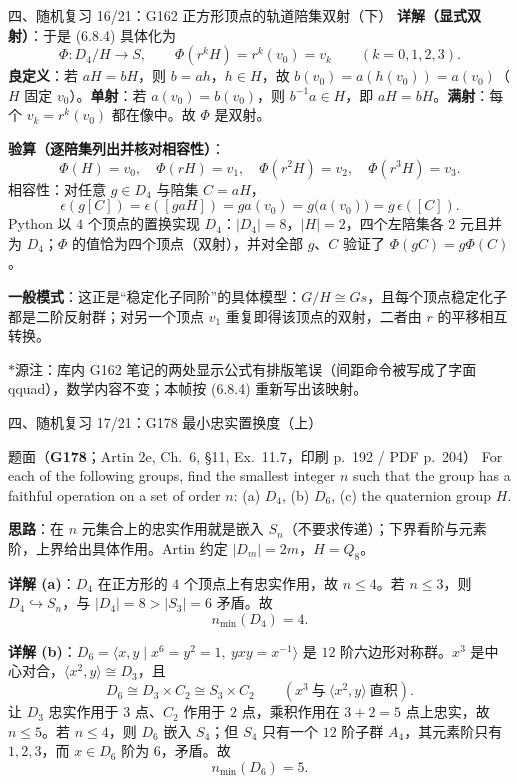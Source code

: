 \documentclass[aspectratio=169,10pt,fontset=none]{ctexbeamer}
\newcommand{\ex}[1]{\textcolor{accent}{\footnotesize\bfseries #1}}
\newcommand{\key}[1]{\textcolor{ink}{\bfseries #1}}
\newcommand{\starpt}{\textcolor{accent}{\bfseries$\ast$}}
\begin{document}
\begin{frame}[t]{四、随机复习 16/21：G162 正方形顶点的轨道\textendash{}陪集双射（下）}
\scriptsize
\key{详解（显式双射）}：于是 (6.8.4) 具体化为
\[ \Phi:D_4/H\longrightarrow S,\qquad \Phi(r^kH)=r^k(v_0)=v_k\qquad(k=0,1,2,3). \]
\textbf{良定义}：若 $aH=bH$，则 $b=ah$，$h\in H$，故 $b(v_0)=a(h(v_0))=a(v_0)$（$H$ 固定 $v_0$）。\textbf{单射}：若 $a(v_0)=b(v_0)$，则 $b^{-1}a\in H$，即 $aH=bH$。\textbf{满射}：每个 $v_k=r^k(v_0)$ 都在像中。故 $\Phi$ 是双射。

\key{验算（逐陪集列出并核对相容性）}：
\[ \Phi(H)=v_0,\quad \Phi(rH)=v_1,\quad \Phi(r^2H)=v_2,\quad \Phi(r^3H)=v_3. \]
相容性：对任意 $g\in D_4$ 与陪集 $C=aH$，
\[ \epsilon(g[C])=\epsilon([gaH])=ga(v_0)=g\bigl(a(v_0)\bigr)=g\,\epsilon([C]). \]
Python 以 $4$ 个顶点的置换实现 $D_4$：$|D_4|=8$，$|H|=2$，四个左陪集各 $2$ 元且并为 $D_4$；$\Phi$ 的值恰为四个顶点（双射），并对全部 $g$、$C$ 验证了 $\Phi(gC)=g\Phi(C)$。

\key{一般模式}：这正是“稳定化子同阶”的具体模型：$G/H\cong G s$，且每个顶点稳定化子都是二阶反射群；对另一个顶点 $v_1$ 重复即得该顶点的双射，二者由 $r$ 的平移相互转换。

\starpt 源注：库内 G162 笔记的两处显示公式有排版笔误（间距命令被写成了字面 qquad），数学内容不变；本帧按 (6.8.4) 重新写出该映射。
\end{frame}

\begin{frame}[t]{四、随机复习 17/21：G178 最小忠实置换度（上）}
\label{ex:G178}
\scriptsize
\begin{block}{\footnotesize 题面（\ex{G178}；Artin 2e, Ch.~6, §11, Ex.~11.7，印刷 p.~192 / PDF p.~204）}
For each of the following groups, find the smallest integer $n$ such that the group has a faithful operation on a set of order $n$: (a) $D_4$, (b) $D_6$, (c) the quaternion group $H$.
\end{block}
\key{思路}：在 $n$ 元集合上的忠实作用就是嵌入 $S_n$（不要求传递）；下界看阶与元素阶，上界给出具体作用。Artin 约定 $|D_m|=2m$，$H=Q_8$。

\key{详解 (a)}：$D_4$ 在正方形的 $4$ 个顶点上有忠实作用，故 $n\le4$。若 $n\le3$，则 $D_4\hookrightarrow S_n$，与 $|D_4|=8>|S_3|=6$ 矛盾。故
\[ n_{\min}(D_4)=4. \]

\key{详解 (b)}：$D_6=\langle x,y\mid x^6=y^2=1,\ yxy=x^{-1}\rangle$ 是 $12$ 阶六边形对称群。$x^3$ 是中心对合，$\langle x^2,y\rangle\cong D_3$，且
\[ D_6\cong D_3\times C_2\cong S_3\times C_2\qquad (x^3\ \text{与}\ \langle x^2,y\rangle\ \text{直积}). \]
让 $D_3$ 忠实作用于 $3$ 点、$C_2$ 作用于 $2$ 点，乘积作用在 $3+2=5$ 点上忠实，故 $n\le5$。若 $n\le4$，则 $D_6$ 嵌入 $S_4$；但 $S_4$ 只有一个 $12$ 阶子群 $A_4$，其元素阶只有 $1,2,3$，而 $x\in D_6$ 阶为 $6$，矛盾。故
\[ n_{\min}(D_6)=5. \]
\end{frame}
\end{document}
